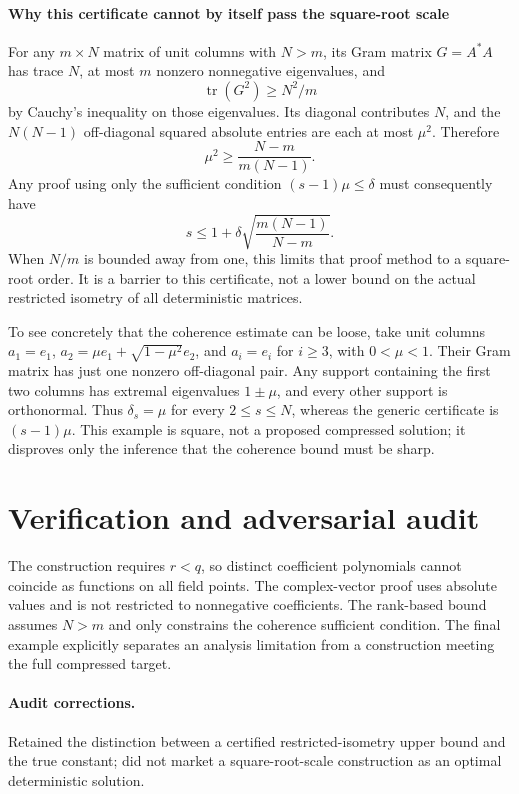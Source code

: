\documentclass[11pt]{article}
\begin{document}
\paragraph{Why this certificate cannot by itself pass the square-root scale}
For any $m\times N$ matrix of unit columns with $N>m$, its Gram matrix $G=A^*A$ has trace $N$, at most $m$ nonzero nonnegative eigenvalues, and
\[
 \operatorname{tr}(G^2)\geq N^2/m
\]
by Cauchy's inequality on those eigenvalues. Its diagonal contributes $N$, and the $N(N-1)$ off-diagonal squared absolute entries are each at most $\mu^2$. Therefore
\[
 \mu^2\geq\frac{N-m}{m(N-1)}.
\]
Any proof using only the sufficient condition $(s-1)\mu\leq\delta$ must consequently have
\[
 s\leq1+\delta\sqrt{\frac{m(N-1)}{N-m}}.
\]
When $N/m$ is bounded away from one, this limits that proof method to a square-root order. It is a barrier to this certificate, not a lower bound on the actual restricted isometry of all deterministic matrices.

To see concretely that the coherence estimate can be loose, take unit columns $a_1=e_1$, $a_2=\mu e_1+\sqrt{1-\mu^2}e_2$, and $a_i=e_i$ for $i\geq3$, with $0<\mu<1$. Their Gram matrix has just one nonzero off-diagonal pair. Any support containing the first two columns has extremal eigenvalues $1\pm\mu$, and every other support is orthonormal. Thus $\delta_s=\mu$ for every $2\leq s\leq N$, whereas the generic certificate is $(s-1)\mu$. This example is square, not a proposed compressed solution; it disproves only the inference that the coherence bound must be sharp.

\section{Verification and adversarial audit}
The construction requires $r<q$, so distinct coefficient polynomials cannot coincide as functions on all field points. The complex-vector proof uses absolute values and is not restricted to nonnegative coefficients. The rank-based bound assumes $N>m$ and only constrains the coherence sufficient condition. The final example explicitly separates an analysis limitation from a construction meeting the full compressed target.
\paragraph{Audit corrections.} Retained the distinction between a certified restricted-isometry upper bound and the true constant; did not market a square-root-scale construction as an optimal deterministic solution.
\end{document}
